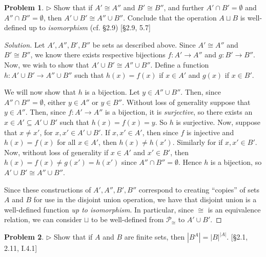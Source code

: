 \documentclass[fontsize=14pt]{scrartcl}
\theoremstyle{definition}
\newtheorem{problem-internal}{Problem}[subsection]
\newenvironment{problem}{
  \medskip
  \begin{problem-internal}
}{
  \end{problem-internal}
}
\newenvironment{solution}{
  \begin{proof}[Solution]
  \vspace{-8px}
  \setlength{\parskip}{4px}
  \setlength{\parindent}{0px}
}{
  \end{proof}
}
\newcommand{\abs}[1]{\left|#1\right|}
\begin{document}
\begin{problem}
$\rhd$ Show that if $A'\cong A''$ and $B'\cong B''$, and further
$A'\cap B'=\emptyset$ and $A''\cap B''=\emptyset$, then $A'\cup B'\cong A''\cup
B''$. Conclude that the operation $A\sqcup B$ is well-defined up to
\textit{isomorphism} (cf. \S2.9) [\S2.9, 5.7]
\end{problem}

\begin{solution}
Let $A',A'',B',B''$ be sets as described above. Since $A'\cong A''$ and $B'\cong
B''$, we know there exists respective bijections $f:A'\to A''$ and $g:B'\to
B''$. Now, we wish to show that $A'\cup B'\cong A''\cup B''$. Define a function
$h:A'\cup B'\to A''\cup B''$ such that $h(x) = f(x)$ if $x\in A'$ and $g(x)$ if
$x\in B'$.

We will now show that $h$ is a bijection. Let $y\in A''\cup B''$. Then, since
$A''\cap B''=\emptyset$, either $y\in A''$ or $y\in B''$. Without loss of
generality suppose that $y\in A''$. Then, since $f:A'\to A''$ is a bijection, it
is \textit{surjective}, so there exists an $x\in A'\subseteq A'\cup B'$ such
that $h(x) = f(x) = y$. So $h$ is surjective. Now, suppose that $x\neq x'$, for
$x,x'\in A'\cup B'$. If $x,x'\in A'$, then since $f$ is injective and $h(x) =
f(x)$ for all $x\in A'$, then $h(x)\neq h(x')$. Similarly for if $x,x'\in B'$.
Now, without loss of generality if $x\in A'$ and $x'\in B'$, then $h(x) = f(x)
\neq g(x') = h(x')$ since $A''\cap B''=\emptyset$. Hence $h$ is a bijection, so
$A'\cup B'\cong A''\cup B''$.

Since these constructions of $A',A'',B',B''$ correspond to creating ``copies''
of sets $A$ and $B$ for use in the disjoint union operation, we have that
disjoint union is a well-defined function \textit{up to isomorphism}. In
particular, since $\cong$ is an equivalence relation, we can consider $\sqcup$
to be well-defined from $\mathscr{P}_{\cong}$ to $A'\cup B'$.
\end{solution}


\begin{problem}
$\rhd$ Show that if $A$ and $B$ are finite sets, then $\abs{B^A} =
\abs{B}^{\abs{A}}$. [\S2.1, 2.11, I.4.1]
\end{problem}
\end{document}

